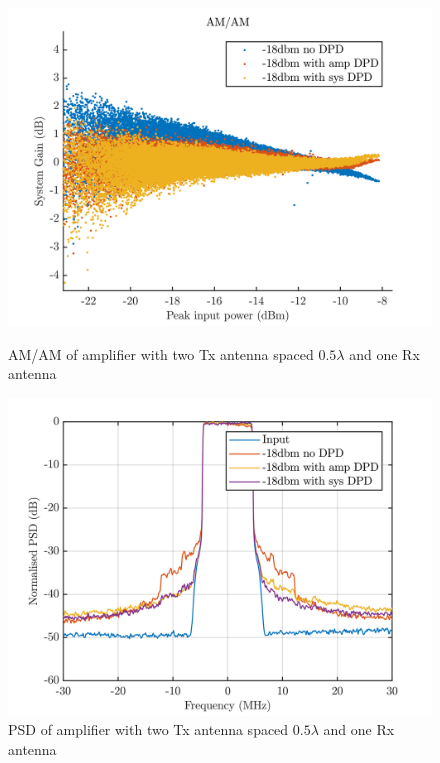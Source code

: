 \begin{figure}[H]
  \centering
  \begin{minipage}[b]{0.5\textwidth}
	\includegraphics[scale = 0.5]{figures/measurement/cree/two/amam_two_ant_0p5.png}
	\caption{AM/AM of amplifier with two Tx antenna spaced $0.5\lambda$ and one Rx antenna}
    \label{fig:cree_amam_two_ant4}
  \end{minipage}
  \hfill
  \begin{minipage}[b]{0.4\textwidth}
\includegraphics[scale = 0.5]{figures/measurement/cree/two/psd_two_ant_0p5.png}
\caption{PSD of amplifier with two Tx antenna spaced $0.5\lambda$ and one Rx antenna}
    \label{fig:cree_psd_two_ant4}
  \end{minipage}
\end{figure}

